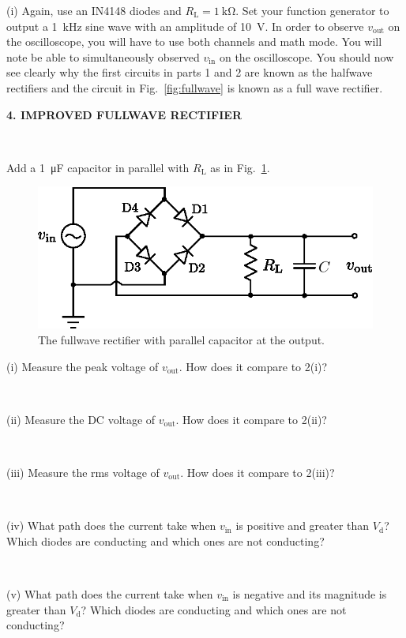 \documentclass[12pt,oneside,openany,letterpaper]{article}
\begin{document}
\noindent (i) Again, use an IN4148 diodes and $R_\mathrm{L}=\SI{1}{\kilo\ohm}$. Set your function generator to output a \SI{1}{\kilo\hertz} sine wave with an amplitude of \SI{10}{\volt}.  In order to observe $v_\mathrm{out}$ on the oscilloscope, you will have to use both channels and math mode.  You will note be able to simultaneously observed $v_\mathrm{in}$ on the oscilloscope.  You should now see clearly why the first circuits in parts 1 and 2 are known as the halfwave rectifiers and the circuit in Fig.~\ref{fig:fullwave} is known as a full wave rectifier. 

\clearpage

{\bf 4. IMPROVED FULLWAVE RECTIFIER}

~

\noindent  Add a \SI{1}{\micro\farad} capacitor in parallel with $R_\mathrm{L}$ as in Fig.~\ref{fig:fullwaveC}.
\begin{figure}[h!]
\begin{center}
\includegraphics[width=.6\textwidth]{fullWaveC.eps}
\caption{\label{fig:fullwaveC}The fullwave rectifier with parallel capacitor at the output.}
\end{center}
\end{figure}

\noindent (i) Measure the peak voltage of $v_\mathrm{out}$. How does it compare to 2(i)?

~

\noindent (ii) Measure the DC voltage of $v_\mathrm{out}$. How does it compare to 2(ii)?

~

\noindent (iii) Measure the rms voltage of $v_\mathrm{out}$. How does it compare to 2(iii)?

~

\noindent (iv) What path does the current take when $v_\mathrm{in}$ is positive and greater than $V_\mathrm{d}$?  Which diodes are conducting and which ones are not conducting?

~

\noindent (v) What path does the current take when $v_\mathrm{in}$ is negative and its magnitude is greater than $V_\mathrm{d}$?  Which diodes are conducting and which ones are not conducting?
 
\end{document}

